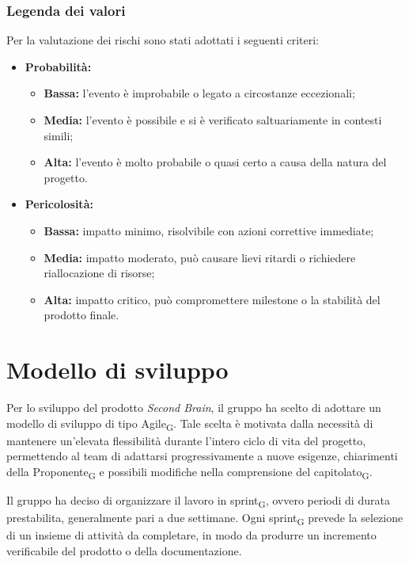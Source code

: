 ﻿\documentclass[a4paper, 10pt, colorlinks=true, linkcolor=black, urlcolor=blue, citecolor=blue, hidelinks]{article}
\begin{document}
\subsubsection{Legenda dei valori}
Per la valutazione dei rischi sono stati adottati i seguenti criteri:

\begin{itemize}
    \item \textbf{Probabilità:}
    \begin{itemize}
        \item \textbf{Bassa:} l'evento è improbabile o legato a circostanze eccezionali;
        \item \textbf{Media:} l'evento è possibile e si è verificato saltuariamente in contesti simili;
        \item \textbf{Alta:} l'evento è molto probabile o quasi certo a causa della natura del progetto.
    \end{itemize}
    \item \textbf{Pericolosità:}
    \begin{itemize}
        \item \textbf{Bassa:} impatto minimo, risolvibile con azioni correttive immediate;
        \item \textbf{Media:} impatto moderato, può causare lievi ritardi o richiedere riallocazione di risorse;
        \item \textbf{Alta:} impatto critico, può compromettere milestone o la stabilità del prodotto finale.
    \end{itemize}
\end{itemize}

\section{Modello di sviluppo}

Per lo sviluppo del prodotto \textit{Second Brain}, il gruppo ha scelto di adottare un modello di sviluppo di tipo Agile\textsubscript{G}. Tale scelta è motivata dalla necessità di mantenere un'elevata flessibilità durante l'intero ciclo di vita del progetto, permettendo al team di adattarsi progressivamente a nuove esigenze, chiarimenti della Proponente\textsubscript{G} e possibili modifiche nella comprensione del capitolato\textsubscript{G}.

Il gruppo ha deciso di organizzare il lavoro in sprint\textsubscript{G}, ovvero periodi di durata prestabilita, generalmente pari a due settimane. Ogni sprint\textsubscript{G} prevede la selezione di un insieme di attività da completare, in modo da produrre un incremento verificabile del prodotto o della documentazione.
\end{document}
